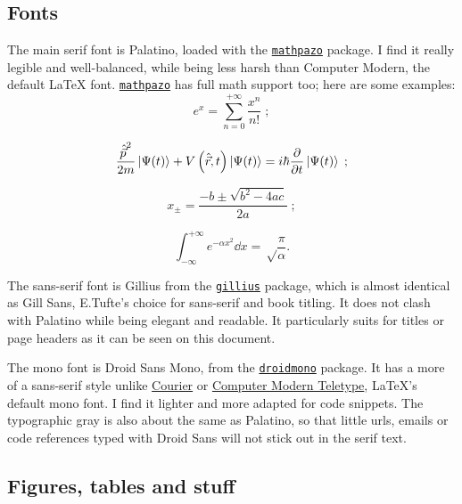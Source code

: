\documentclass[raggedright, twoside, 11pt, colorful]{tufte-style-article}
\begin{document}
\subsection{Fonts}

The main serif font is Palatino, loaded with the \href{www.ctan.org/pkg/mathpazo}{\texttt{mathpazo}} package. I find it really legible and well-balanced, while being less harsh than Computer Modern, the default \LaTeX{} font. \href{www.ctan.org/pkg/mathpazo}{\texttt{mathpazo}} has full math support too; here are some examples:
$$
e^x = \sum_{n=0}^{+\infty} \frac{x^n}{n!} \;;
$$

$$
\frac{{\hat{\vec p}}^2}{2m}\ket{\Psi(t)} + V\left(\hat{\vec r},t\right)\ket{\Psi(t)} = i\hbar \pdv{}{t}\ket{\Psi(t)} \;;
$$

$$
x_\pm = \frac{-b \pm \sqrt{b^2 - 4ac}}{2a}\;;
$$

$$
\int_{-\infty}^{+\infty} e^{-\alpha x^2} \dd{x} = \sqrt\frac{\pi}{\alpha}.
$$

\begingroup\sffamily
The sans-serif font is Gillius from the \href{www.ctan.org/pkg/gillius}{\texttt{gillius}} package, which is almost identical as Gill Sans, E.Tufte's choice for sans-serif and book titling. It does not clash with Palatino while being elegant and readable. It particularly suits for titles or page headers as it can be seen on this document.
\endgroup

\begingroup\ttfamily
The mono font is Droid Sans Mono, from the \href{www.ctan.org/pkg/droid}{\texttt{droidmono}} package. It has a more of a sans-serif style unlike \href{www.ctan.org/tex-archive/fonts/psfonts/psnfss-source/courier}{Courier} or \href{www.ctan.org/tex-archive/fonts/cm/}{Computer Modern Teletype}, \LaTeX{}'s default mono font. I find it lighter and more adapted for code snippets. The typographic gray is also about the same as Palatino, so that little urls, emails or code references typed with Droid Sans will not stick out in the serif text.
\endgroup

\newpage


\subsection{Figures, tables and stuff}
\end{document}
